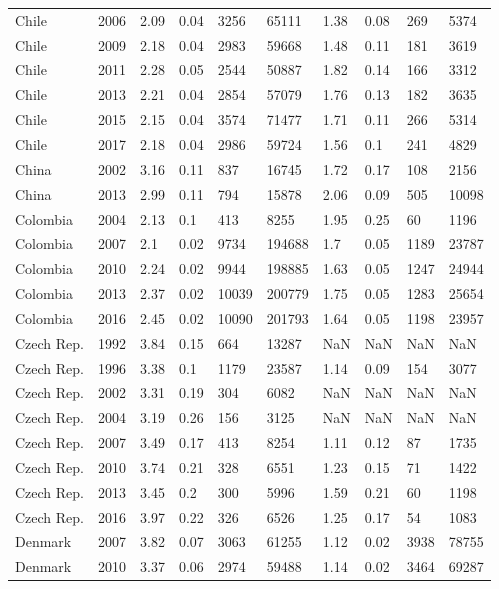 \begin{tabular}{llllllllll}
Chile & 2006 & 2.09 & 0.04 & 3256 & 65111 & 1.38 & 0.08 & 269 & 5374 \\ 
Chile & 2009 & 2.18 & 0.04 & 2983 & 59668 & 1.48 & 0.11 & 181 & 3619 \\ 
Chile & 2011 & 2.28 & 0.05 & 2544 & 50887 & 1.82 & 0.14 & 166 & 3312 \\ 
Chile & 2013 & 2.21 & 0.04 & 2854 & 57079 & 1.76 & 0.13 & 182 & 3635 \\ 
Chile & 2015 & 2.15 & 0.04 & 3574 & 71477 & 1.71 & 0.11 & 266 & 5314 \\ 
Chile & 2017 & 2.18 & 0.04 & 2986 & 59724 & 1.56 & 0.1 & 241 & 4829 \\ 
China & 2002 & 3.16 & 0.11 & 837 & 16745 & 1.72 & 0.17 & 108 & 2156 \\ 
China & 2013 & 2.99 & 0.11 & 794 & 15878 & 2.06 & 0.09 & 505 & 10098 \\ 
Colombia & 2004 & 2.13 & 0.1 & 413 & 8255 & 1.95 & 0.25 & 60 & 1196 \\ 
Colombia & 2007 & 2.1 & 0.02 & 9734 & 194688 & 1.7 & 0.05 & 1189 & 23787 \\ 
Colombia & 2010 & 2.24 & 0.02 & 9944 & 198885 & 1.63 & 0.05 & 1247 & 24944 \\ 
Colombia & 2013 & 2.37 & 0.02 & 10039 & 200779 & 1.75 & 0.05 & 1283 & 25654 \\ 
Colombia & 2016 & 2.45 & 0.02 & 10090 & 201793 & 1.64 & 0.05 & 1198 & 23957 \\ 
Czech Rep. & 1992 & 3.84 & 0.15 & 664 & 13287 & NaN & NaN & NaN & NaN \\ 
Czech Rep. & 1996 & 3.38 & 0.1 & 1179 & 23587 & 1.14 & 0.09 & 154 & 3077 \\ 
Czech Rep. & 2002 & 3.31 & 0.19 & 304 & 6082 & NaN & NaN & NaN & NaN \\ 
Czech Rep. & 2004 & 3.19 & 0.26 & 156 & 3125 & NaN & NaN & NaN & NaN \\ 
Czech Rep. & 2007 & 3.49 & 0.17 & 413 & 8254 & 1.11 & 0.12 & 87 & 1735 \\ 
Czech Rep. & 2010 & 3.74 & 0.21 & 328 & 6551 & 1.23 & 0.15 & 71 & 1422 \\ 
Czech Rep. & 2013 & 3.45 & 0.2 & 300 & 5996 & 1.59 & 0.21 & 60 & 1198 \\ 
Czech Rep. & 2016 & 3.97 & 0.22 & 326 & 6526 & 1.25 & 0.17 & 54 & 1083 \\ 
Denmark & 2007 & 3.82 & 0.07 & 3063 & 61255 & 1.12 & 0.02 & 3938 & 78755 \\ 
Denmark & 2010 & 3.37 & 0.06 & 2974 & 59488 & 1.14 & 0.02 & 3464 & 69287 \\ 

\end{tabular}
